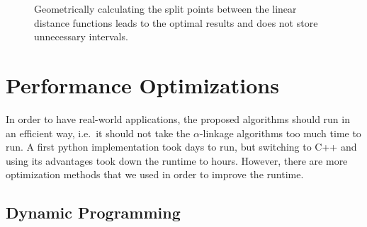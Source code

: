 \begin{figure}
    \centering
    \caption{Geometrically calculating the split points between the linear distance functions leads to the optimal results and does not store unnecessary intervals.}
    \label{fig:optimal}
\end{figure}

\section{Performance Optimizations}

In order to have real-world applications, the proposed algorithms should run in an efficient way, i.e.\ it should not take the $\alpha$-linkage algorithms too much time to run. A first python implementation took days to run, but switching to C++ and using its advantages took down the runtime to hours. However, there are more optimization methods that we used in order to improve the runtime.

\subsection{Dynamic Programming}


